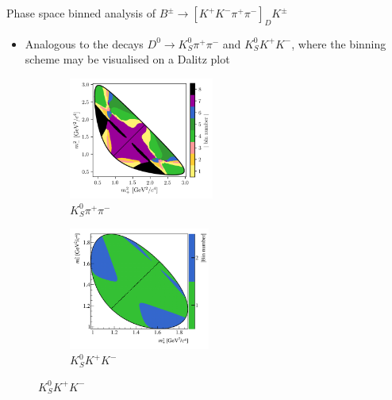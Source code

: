 \documentclass{beamer}
\begin{document}
\begin{frame}{Phase space binned analysis of $B^\pm\to[K^+K^-\pi^+\pi^-]_DK^\pm$}
  \begin{itemize}
    \setlength\itemsep{1.0em}
    \item{Analogous to the decays $D^0\to K_S^0\pi^+\pi^-$ and $K_S^0K^+K^-$, where the binning scheme may be visualised on a Dalitz plot}
  \end{itemize}
  \begin{figure}
    \begin{subfigure}{0.45\textwidth}
      \includegraphics[height = 4cm]{Plots/KsPiPi_optimal.png}
      \caption*{$K_S^0\pi^+\pi^-$}
    \end{subfigure}%
    \begin{subfigure}{0.45\textwidth}
      \includegraphics[height = 4cm]{Plots/KsKK_binning.png}
      \caption*{$K_S^0K^+K^-$}
    \end{subfigure}
  \end{figure}
\end{frame}
\end{document}
